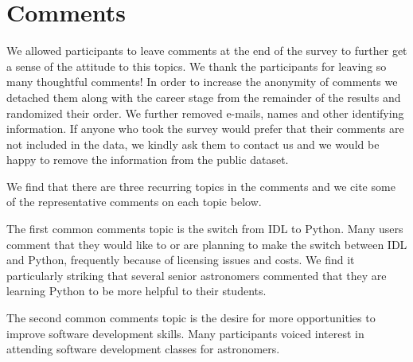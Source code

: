 \section{Comments}
\label{sec:comments}

We allowed participants to leave comments at the end of the survey to further get a sense of the attitude to this topics. We thank the participants for leaving so many thoughtful comments! In order to increase the anonymity of comments we detached them along with the career stage from the remainder of the results and randomized their order. We further removed e-mails, names and other identifying information. If anyone who took the survey would prefer that their comments are not included in the data, we kindly ask them to contact us and we would be happy to remove the information from the public dataset. 

We find that there are three recurring topics in the comments and we cite some of the representative comments on each topic below. 

The first common comments topic is the switch from IDL to Python. Many users comment that they would like to or are planning to make the switch between IDL and Python, frequently because of licensing issues and costs. We find it particularly striking that several senior astronomers commented that they are learning Python to be more helpful to their students.

The second common comments topic is the desire for more opportunities to improve software development skills. Many participants voiced interest in attending software development classes for astronomers.

